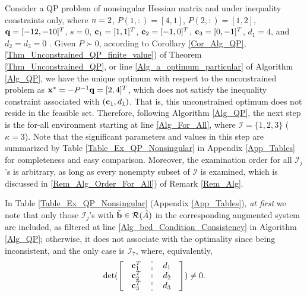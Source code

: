 \documentclass{imaman}
\newcommand{\beq}{\begin{eqnarray}}
\newcommand{\eeq}{\end{eqnarray}}
\newcommand{\bfb}{{\bf b}}
\newcommand{\bfc}{{\bf c}}
\newcommand{\bfx}{{\bf x}}
\newcommand{\bfq}{{\bf q}}
\newcommand{\calI}{{\mathcal I}}
\newcommand{\calR}{{\mathcal R}}
\newcommand{\itn}{{\it n}}
\numberwithin{equation}{section}
\begin{document}
\begin{example}
Consider a QP problem of nonsingular Hessian matrix and under inequality constraints only, where $\itn=2$, $P(1,:)=[4,1]$, $P(2,:)=[1,2]$, $\bfq=[-12,-10]^T$, $s=0$, $\bfc_1=[1,1]^T$, $\bfc_2=[-1,0]^T$, $\bfc_3=[0,-1]^T$, $d_1=4$, and $d_2=d_3=0$ \cite{Lu(Ye):03(16)}. Given $P\succ 0$, according to Corollary \ref{Cor_Alg_QP}, \ref{Thm_Unconstrained_QP_finite_value}) of Theorem \ref{Thm_Unconstrained_QP}, or line \ref{Alg_a_optimum_particular} of Algorithm \ref{Alg_QP}, we have the unique optimum with respect to the unconstrained problem as $\bfx^*=-P^{-1}\bfq=[2,4]^T$, which does not satisfy the inequality constraint associated with $(\bfc_1,d_1)$. That is, this unconstrained optimum does not reside in the feasible set. Therefore, following Algorithm \ref{Alg_QP}, the next step is the for-all environment starting at line \ref{Alg_For_All}, where $\calI=\{1,2,3\}$ ($\kappa=3$). Note that the significant parameters and values in this step are summarized by Table \ref{Table_Ex_QP_Nonsingular} in Appendix \ref{App_Tables} for completeness and easy comparison. Moreover, the examination order for all $\calI_j$'s is arbitrary, as long as every nonempty subset of $\calI$ is examined, which is discussed in \ref{Rem_Alg_Order_For_All}) of Remark \ref{Rem_Alg}.

In Table \ref{Table_Ex_QP_Nonsingular} (Appendix \ref{App_Tables}), \textit{at first} we note that only those $\calI_j$'s with $\tilde\bfb\in\calR(\tilde A)$ in the corresponding augmented system are included, as filtered at line \ref{Alg_bcd_Condition_Consistency} in Algorithm \ref{Alg_QP}; otherwise, it does not associate with the optimality since being inconsistent, and the only case is $\calI_7$, where, equivalently,
\beq
\mbox{det}(\left[\def\arraystretch{1} \begin{array}{c:c}
\begin{array}{c} \bfc_1^T~\\ \bfc_2^T~\\ \bfc_3^T~ \end{array} &
\begin{array}{c} ~d_1\\ ~d_2 \\ ~d_3 \end{array} \end{array}\right])\ne 0.\nonumber
\eeq


\end{example}
\end{document}
